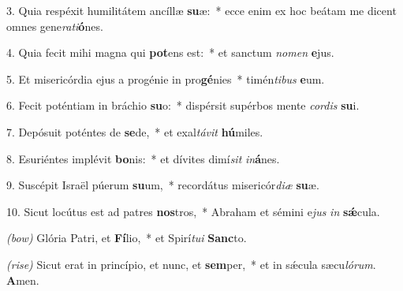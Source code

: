3. Quia respéxit humilitátem ancíllæ \textbf{su}æ:~*
	ecce enim ex hoc beátam me dicent omnes gene\textit{ra}\textit{ti}\textbf{ó}nes.

4. Quia fecit mihi magna qui \textbf{pot}ens est:~* 
	et sanctum \textit{no}\textit{men} \textbf{e}jus.

5. Et misericórdia ejus a progénie in pro\textbf{gé}nies~*
	timén\textit{ti}\textit{bus} \textbf{e}um.

6. Fecit poténtiam in bráchio \textbf{su}o:~*
	dispérsit supérbos mente \textit{cor}\textit{dis} \textbf{su}i.

7. Depósuit poténtes de \textbf{se}de,~*
	et exal\textit{tá}\textit{vit} \textbf{hú}miles.

8. Esuriéntes implévit \textbf{bo}nis:~*
	et dívites dimí\textit{sit} \textit{in}\textbf{á}nes.

9. Suscépit Israël púerum \textbf{su}um,~*
	recordátus misericór\textit{di}\textit{æ} \textbf{su}æ.

10. Sicut locútus est ad patres \textbf{nos}tros,~*
	Abraham et sémini e\textit{jus} \textit{in} \textbf{s\'{\ae}}cula.

\textit{(bow)} Glória Patri, et \textbf{Fí}lio,~* 
	et Spirí\textit{tu}\textit{i} \textbf{Sanc}to.

\textit{(rise)} Sicut erat in princípio, et nunc, et \textbf{sem}per,~*
	et in s\'{\ae}cula sæcu\textit{ló}\textit{rum}. \textbf{A}men.